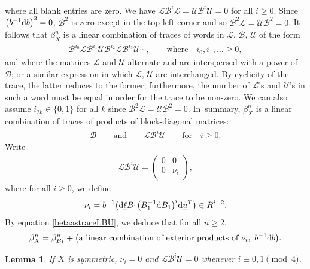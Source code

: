 \documentclass[pdftex]{sigma}%
\newtheorem{lem}[thm]{Lemma}
\numberwithin{equation}{section}
\newcommand{\0}{\color{blue}{\mathsf{0}}}
\begin{document}
where all blank entries are zero. We have $\mathcal{L} \mathcal{B}^i \mathcal{L}= \mathcal{U} \mathcal{B}^i \mathcal{U}=0$ for all $i\geq 0$.
Since $\big(b^{-1} {\rm d}b\big)^2=0$, $\mathcal{B}^2$ is zero except in the top-left corner and so $\mathcal{B}^2 \mathcal{L} = \mathcal{U} \mathcal{B}^2=0$. It follows that $\beta^n_X$ is a linear combination of traces of words in $\mathcal{L}$, $\mathcal{B}$, $\mathcal{U}$ of the form
\begin{gather*}
 \mathcal{B}^{i_0} \mathcal{L} \mathcal{B}^{i_1} \mathcal{U} \mathcal{B}^{i_2} \mathcal{L} \mathcal{B}^{i_3} \mathcal{U} \cdots, \qquad \text{where} \quad i_0,i_1,\ldots \geq 0,
 \end{gather*}
 and where the matrices $\mathcal{L}$ and $\mathcal{U}$ alternate and are interspersed with a power of $\mathcal{B}$; or a similar expression in which $\mathcal{L}$, $\mathcal{U}$ are interchanged. By cyclicity of the trace, the latter reduces to the former; furthermore, the
number of $\mathcal{L}$'s and $\mathcal{U}$'s in such a word must be equal in order for the trace to be non-zero.
We can also assume $i_{2k} \in \{0, 1\}$ for all $k$ since $\mathcal{B}^2 \mathcal{L} = \mathcal{U} \mathcal{B}^2=0$. In~summary, $\beta^n_X$ is a linear combination of traces of products of block-diagonal matrices:
 \begin{gather*}
 \mathcal{B}\qquad \text{and} \qquad \mathcal{L} \mathcal{B}^i \mathcal{U} \qquad \text{for}\quad i \geq 0.
 \end{gather*}
 Write
\begin{gather*}
\mathcal{L}\mathcal{B}^i \mathcal{U} = \left(
\begin{array}{c|c}
 0 & 0 \\ \hline
 0 & \nu_i \\
\end{array}
\right)\!,
\end{gather*}
where for all $i\geq 0$, we define
\begin{gather} \label{nuidefn}
\nu_i = b^{-1} \big({\rm d} \underline{\ell} B_1 \big(B_1^{-1} {\rm d}B_1 \big)^i {\rm d} \underline{u}^T \big) \in R^{i+2}.
\end{gather}
By equation \eqref{betaastraceLBU}, we deduce that for all $n\geq 2$,
\begin{gather} \label{betaXasB1andnus}
\beta_{X}^n = \beta_{B_1}^n + \big(\text{a linear combination of exterior products of } \nu_i,\ b^{-1} {\rm d}b \big).
\end{gather}

\begin{lem} \label{lem: nuvanishes} If $X$ is symmetric, $\nu_i=0$ and
 $\mathcal{L} \mathcal{B}^i \mathcal{U} =0$ whenever $i\equiv 0,1 \pmod 4$.
\end{lem}
\end{document}
